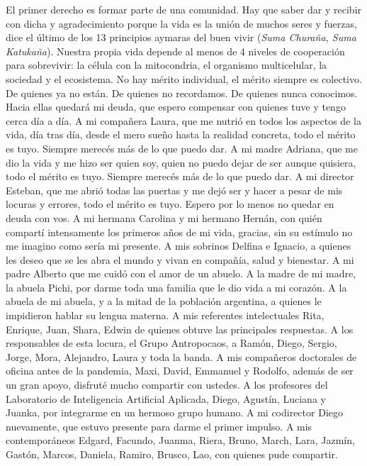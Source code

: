 \documentclass[a4paper,11pt]{book}
\theoremstyle{definition}
\begin{document}
El primer derecho es formar parte de una comunidad.
%
Hay que saber dar y recibir con dicha y agradecimiento porque la vida es la uni\'on de muchos seres y fuerzas, dice el \'ultimo de los 13 principios aymaras del buen vivir (\emph{Suma Chura\~na, Suma Katuka\~na}).
%
Nuestra propia vida depende al menos de 4 niveles de cooperaci\'on para sobrevivir: la c\'elula con la mitocondria, el organismo multicelular, la sociedad y el ecosistema.
%
No hay m\'erito individual, el m\'erito siempre es colectivo.
%
De quienes ya no est\'an.
%
De quienes no recordamos.
%
De quienes nunca conocimos.
%
Hacia ellas quedar\'a mi deuda, que espero compensar con quienes tuve y tengo cerca d\'ia a d\'ia.
%
A mi compa\~nera Laura, que me nutri\'o en todos los aspectos de la vida, d\'ia tras d\'ia, desde el mero sue\~no hasta la realidad concreta, todo el m\'erito es tuyo. Siempre merec\'es m\'as de lo que puedo dar.
%
A mi madre Adriana, que me dio la vida y me hizo ser quien soy, quien no puedo dejar de ser aunque quisiera, todo el m\'erito es tuyo. Siempre merec\'es m\'as de lo que puedo dar.
%
A mi director Esteban, que me abri\'o todas las puertas y me dej\'o ser y hacer a pesar de mis locuras y errores, todo el m\'erito es tuyo. Espero por lo menos no quedar en deuda con vos.
%
A mi hermana Carolina y mi hermano Hern\'an, con qui\'en compart\'i intensamente los primeros a\~nos de mi vida, gracias, sin su est\'imulo no me imagino como ser\'ia mi presente.
%
A mis sobrinos Delfina e Ignacio, a quienes les deseo que se les abra el mundo y vivan en compa\~n\'ia, salud y bienestar.
%
A mi padre Alberto que me cuid\'o con el amor de un abuelo.
%
A la madre de mi madre, la abuela Pichi, por darme toda una familia que le dio vida a mi coraz\'on.
%
A la abuela de mi abuela, y a la mitad de la poblaci\'on argentina, a quienes le impidieron hablar su lengua materna.
%
A mis referentes intelectuales Rita, Enrique, Juan, Shara, Edwin de quienes obtuve las principales respuestas.
%
A los responsables de esta locura, el Grupo Antropocaos, a Ram\'on, Diego, Sergio, Jorge, Mora, Alejandro, Laura y toda la banda.
%
A mis compa\~neros doctorales de oficina antes de la pandemia, Maxi, David, Emmanuel y Rodolfo, adem\'as de ser un gran apoyo, disfrut\'e mucho compartir con ustedes.
%
A los profesores del Laboratorio de Inteligencia Artificial Aplicada, Diego, Agust\'in, Luciana y Juanka, por integrarme en un hermoso grupo humano.
%
A mi codirector Diego nuevamente, que estuvo presente para darme el primer impulso.
%
A mis contempor\'aneos Edgard, Facundo, Juanma, Riera, Bruno, March, Lara, Jazm\'in, Gast\'on, Marcos, Daniela, Ramiro, Brusco, Lao, con quienes pude compartir.
\end{document}
